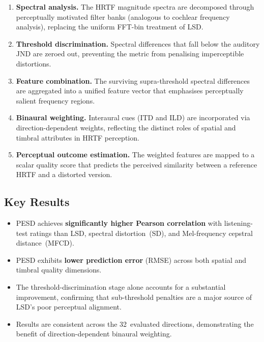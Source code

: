 \documentclass[12pt,a4paper]{article}
\begin{document}
\begin{enumerate}
  \item \textbf{Spectral analysis.}
        The HRTF magnitude spectra are decomposed through perceptually
        motivated filter banks (analogous to cochlear frequency analysis),
        replacing the uniform FFT-bin treatment of LSD.

  \item \textbf{Threshold discrimination.}
        Spectral differences that fall below the auditory JND are zeroed
        out, preventing the metric from penalising imperceptible
        distortions.

  \item \textbf{Feature combination.}
        The surviving supra-threshold spectral differences are aggregated
        into a unified feature vector that emphasises perceptually salient
        frequency regions.

  \item \textbf{Binaural weighting.}
        Interaural cues (ITD and ILD) are incorporated via direction-dependent
        weights, reflecting the distinct roles of spatial and timbral
        attributes in HRTF perception.

  \item \textbf{Perceptual outcome estimation.}
        The weighted features are mapped to a scalar quality score that
        predicts the perceived similarity between a reference HRTF and a
        distorted version.
\end{enumerate}

\subsection{Key Results}

\begin{itemize}
  \item PESD achieves \textbf{significantly higher Pearson correlation}
        with listening-test ratings than LSD, spectral distortion~(SD),
        and Mel-frequency cepstral distance~(MFCD).
  \item PESD exhibits \textbf{lower prediction error} (RMSE) across both
        spatial and timbral quality dimensions.
  \item The threshold-discrimination stage alone accounts for a
        substantial improvement, confirming that sub-threshold penalties
        are a major source of LSD's poor perceptual alignment.
  \item Results are consistent across the 32~evaluated directions,
        demonstrating the benefit of direction-dependent binaural weighting.
\end{itemize}
\end{document}
